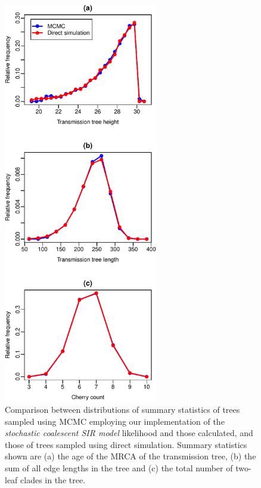 \documentclass[10pt]{article}
\begin{document}
\begin{figure}
  \vspace{-3cm}

    \begin{center}
      \includegraphics[width=0.6\textwidth]{stochCoalFigure-crop.pdf}
    \end{center}
    \caption{Comparison between distributions of summary statistics of
      trees sampled using MCMC employing our implementation of the
      \emph{stochastic coalescent SIR model} likelihood and those
      calculated, and those of trees sampled using direct
      simulation. Summary statistics shown are (a) the age of the MRCA
      of the transmission tree, (b) the sum of all edge lengths in the
      tree and (c) the total number of two-leaf clades in the tree.}
    \label{fig:stochCoalValidation}
\end{figure}
\end{document}
